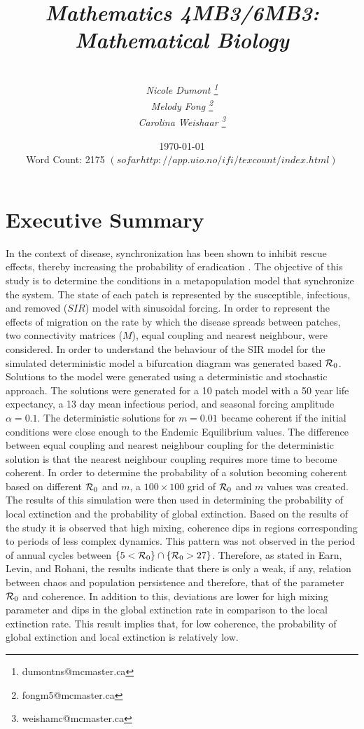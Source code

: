 \documentclass[twocolumn,nofootinbib,showkeys,twoside,floatfix,unsortedaddress,flushbottom,10pt,aps,pra]{report}
\author{\sc{\bfseries Model Students:}\\
\small \emph{Nicole Dumont \footnote{dumontns@mcmaster.ca}} \\
 \small \emph{Melody Fong \footnote{fongm5@mcmaster.ca}} \\
 \small  \emph{Carolina Weishaar \footnote{weishamc@mcmaster.ca}}}
\title{ \small \emph{Mathematics 4MB3/6MB3: Mathematical Biology }\\
  \Huge \sc{\bfseries Spatial Epidemics Dynamics:\\ Synchronization}}
\date{\today \\
  Word Count: 2175 $(so far http://app.uio.no/ifi/texcount/index.html)$}
\begin{document}
\pagestyle{fancy}

\maketitle
\tableofcontents

\onecolumn
\section*{\Huge Executive Summary}

In the context of disease, synchronization has been shown to inhibit rescue effects, thereby increasing the probability of eradication  \cite{McCluskey2011}. The objective of this study is to determine the conditions in a metapopulation model that synchronize the system. The state of each patch is represented by the susceptible, infectious, and removed ($SIR$) model with sinusoidal forcing. In order to represent the effects of migration on the rate by which the disease spreads between patches, two connectivity matrices ($M$), equal coupling and nearest neighbour, were considered. In order to understand the behaviour of the SIR model for the simulated deterministic model a bifurcation diagram was generated based ${\cal R}_0$. Solutions to the model were generated using a deterministic and stochastic approach. The solutions were generated for a 10 patch model with a 50 year life expectancy, a 13 day mean infectious period, and seasonal forcing amplitude $\alpha = 0.1$. The deterministic solutions for $m=0.01$ became coherent if the initial conditions were close enough to the Endemic Equilibrium values. The difference between equal coupling and nearest neighbour coupling for the deterministic solution is that the nearest neighbour coupling requires more time to become coherent. In order to determine the probability of a solution becoming coherent based on different ${\cal R}_0$ and $m$, a $100\times100$ grid of ${\cal R}_0$ and $m$ values was created.  The results of this simulation were then used in determining the probability of local extinction and the probability of global extinction. 
\smallskip
Based on the results of the study it is observed that high mixing, coherence dips in regions corresponding to periods of less complex dynamics. This pattern was not observed in the period of annual cycles between $\{5<{\cal R}_0\}\cap\{{\cal R}_0>27\}$. Therefore, as stated in Earn, Levin, and Rohani, the results indicate that there is only a weak, if any, relation between chaos and population persistence\cite{Earn2000} and therefore, that of the parameter ${\cal R}_0$ and coherence. In addition to this, deviations are lower for high mixing parameter and dips in the global extinction rate in comparison to the local extinction rate. This result implies that, for low coherence, the probability of global extinction and local extinction is relatively low.
\end{document}
